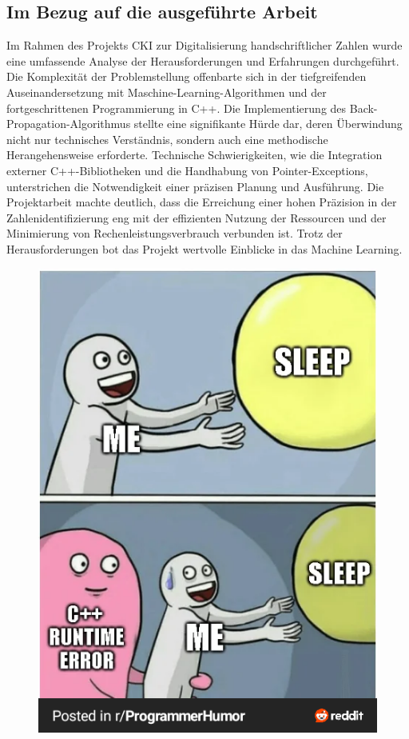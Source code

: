 \subsection{Im Bezug auf die ausgeführte Arbeit}
Im Rahmen des Projekts CKI zur Digitalisierung handschriftlicher Zahlen wurde eine umfassende Analyse der Herausforderungen und Erfahrungen durchgeführt. Die Komplexität der Problemstellung offenbarte sich in der tiefgreifenden Auseinandersetzung mit Maschine-Learning-Algorithmen und der fortgeschrittenen Programmierung in C++. Die Implementierung des Back-Propagation-Algorithmus stellte eine signifikante Hürde dar, deren Überwindung nicht nur technisches Verständnis, sondern auch eine methodische Herangehensweise erforderte. Technische Schwierigkeiten, wie die Integration externer C++-Bibliotheken und die Handhabung von Pointer-Exceptions, unterstrichen die Notwendigkeit einer präzisen Planung und Ausführung. Die Projektarbeit machte deutlich, dass die Erreichung einer hohen Präzision in der Zahlenidentifizierung eng mit der effizienten Nutzung der Ressourcen und der Minimierung von Rechenleistungsverbrauch verbunden ist. Trotz der Herausforderungen bot das Projekt wertvolle Einblicke in das Machine Learning.
\begin{figure}[htbp]
	\centering
		\includegraphics{runtimeerror.png}
	\label{fig:runtimeerror}
\end{figure}

